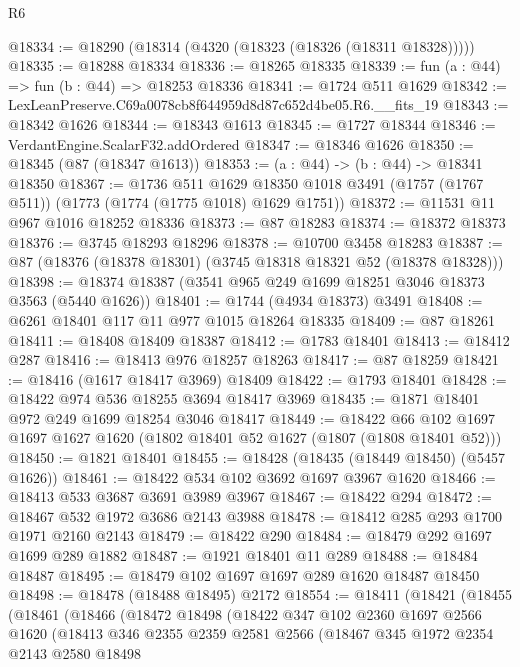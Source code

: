 \begin{lexlean}{R6}
\begin{coremodule}
@18334 := @18290 (@18314 (@4320 (@18323 (@18326 (@18311 @18328)))))
@18335 := @18288 @18334
@18336 := @18265 @18335
@18339 := fun (a : @44) => fun (b : @44) => @18253 @18336
@18341 := @1724 @511 @1629
@18342 := LexLeanPreserve.C69a0078cb8f644959d8d87c652d4be05.R6.__fits_19
@18343 := @18342 @1626
@18344 := @18343 @1613
@18345 := @1727 @18344
@18346 := VerdantEngine.ScalarF32.addOrdered
@18347 := @18346 @1626
@18350 := @18345 (@87 (@18347 @1613))
@18353 := (a : @44) -> (b : @44) -> @18341 @18350
@18367 := @1736
    @511
    @1629
    @18350
    @1018
    @3491
    (@1757 (@1767 @511))
    (@1773 (@1774 (@1775 @1018) @1629 @1751))
@18372 := @11531 @11 @967 @1016 @18252 @18336
@18373 := @87 @18283
@18374 := @18372 @18373
@18376 := @3745 @18293 @18296
@18378 := @10700 @3458 @18283
@18387 := @87 (@18376 (@18378 @18301) (@3745 @18318 @18321 @52 (@18378 @18328)))
@18398 := @18374 @18387 (@3541 @965 @249 @1699 @18251 @3046 @18373 @3563 (@5440 @1626))
@18401 := @1744 (@4934 @18373) @3491
@18408 := @6261 @18401 @117 @11 @977 @1015 @18264 @18335
@18409 := @87 @18261
@18411 := @18408 @18409 @18387
@18412 := @1783 @18401
@18413 := @18412 @287
@18416 := @18413 @976 @18257 @18263
@18417 := @87 @18259
@18421 := @18416 (@1617 @18417 @3969) @18409
@18422 := @1793 @18401
@18428 := @18422 @974 @536 @18255 @3694 @18417 @3969
@18435 := @1871 @18401 @972 @249 @1699 @18254 @3046 @18417
@18449 := @18422
    @66
    @102
    @1697
    @1697
    @1627
    @1620
    (@1802 @18401 @52 @1627 (@1807 (@1808 @18401 @52)))
@18450 := @1821 @18401
@18455 := @18428 (@18435 (@18449 @18450) (@5457 @1626))
@18461 := @18422 @534 @102 @3692 @1697 @3967 @1620
@18466 := @18413 @533 @3687 @3691 @3989 @3967
@18467 := @18422 @294
@18472 := @18467 @532 @1972 @3686 @2143 @3988
@18478 := @18412 @285 @293 @1700 @1971 @2160 @2143
@18479 := @18422 @290
@18484 := @18479 @292 @1697 @1699 @289 @1882
@18487 := @1921 @18401 @11 @289
@18488 := @18484 @18487
@18495 := @18479 @102 @1697 @1697 @289 @1620 @18487 @18450
@18498 := @18478 (@18488 @18495) @2172
@18554 := @18411
    (@18421
      (@18455
        (@18461
          (@18466
            (@18472
              @18498
              (@18422
                @347
                @102
                @2360
                @1697
                @2566
                @1620
                (@18413
                  @346
                  @2355
                  @2359
                  @2581
                  @2566
                  (@18467
                    @345
                    @1972
                    @2354
                    @2143
                    @2580
                    @18498

\end{coremodule}
\end{lexlean}
